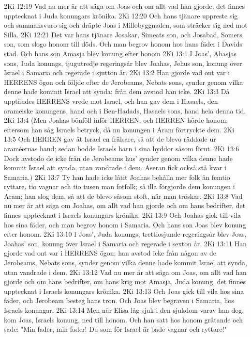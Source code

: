 2Ki 12:19  Vad nu mer är att säga om Joas och om allt vad han gjorde, det finnes upptecknat i Juda konungars krönika.
2Ki 12:20  Och hans tjänare uppreste sig och sammansvuro sig och dräpte Joas i Millobyggnaden, som sträcker sig ned mot Silla.
2Ki 12:21  Det var hans tjänare Josakar, Simeats son, och Josabad, Somers son, som slogo honom till döds. Och man begrov honom hos hans fäder i Davids stad. Och hans son Amasja blev konung efter honom
2Ki 13:1  I Joas', Ahasjas sons, Juda konungs, tjugutredje regeringsår blev Joahas, Jehus son, konung över Israel i Samaria och regerade i sjutton år.
2Ki 13:2  Han gjorde vad ont var i HERRENS ögon och följde efter de Jerobeams, Nebats sons, synder genom vilka denne hade kommit Israel att synda; från dem avstod han icke.
2Ki 13:3  Då upptändes HERRENS vrede mot Israel, och han gav dem i Hasaels, den arameiske konungens, hand och i Ben-Hadads, Hasaels sons, hand hela denna tid.
2Ki 13:4  (Men Joahas bönföll inför HERREN, och HERREN hörde honom, eftersom han såg Israels betryck, då nu konungen i Aram förtryckte dem.
2Ki 13:5  Och HERREN gav åt Israel en frälsare, så att de blevo räddade ur araméernas hand; sedan bodde Israels barn i sina hyddor såsom förut.
2Ki 13:6  Dock avstodo de icke från de Jerobeams hus' synder genom vilka denne hade kommit Israel att synda, utan vandrade i dem. Aseran fick också stå kvar i Samaria.)
2Ki 13:7  Ty han hade icke låtit Joahas behålla mer folk än femtio ryttare, tio vagnar och tio tusen man fotfolk; så illa förgjorde dem konungen i Aram; han slog dem, så att de blevo såsom stoft, när man tröskar.
2Ki 13:8  Vad nu mer är att säga om Joahas, om allt vad han gjorde och om hans bedrifter, det finnes upptecknat i Israels konungars krönika.
2Ki 13:9  Och Joahas gick till vila hos sina fäder, och man begrov honom i Samaria. Och hans son Joas blev konung efter honom.
2Ki 13:10  I Joas', Juda konungs, trettiosjunde regeringsår blev Joas, Joahas' son, konung över Israel i Samaria och regerade i sexton år.
2Ki 13:11  Han gjorde vad ont var i HERRENS ögon; han avstod icke från någon av de Jerobeams, Nebats sons, synder genom vilka denne hade kommit Israel att synda, utan vandrade i dem.
2Ki 13:12  Vad nu mer är att säga om Joas, om allt vad han gjorde och om hans bedrifter, om hans krig mot Amasja, Juda konung, det finnes upptecknat i Israels konungars krönika.
2Ki 13:13  Och Joas gick till vila hos sina fäder, och Jerobeam besteg hans tron. Och Joas blev begraven i Samaria, hos Israels konungar.
2Ki 13:14  Men när Elisa låg sjuk i den sjukdom varav han dog, kom Joas, Israels konung, ned till honom. Och han satt hos honom gråtande och sade: "Min fader, min fader! Du som för Israel är både vagnar och ryttare!"
